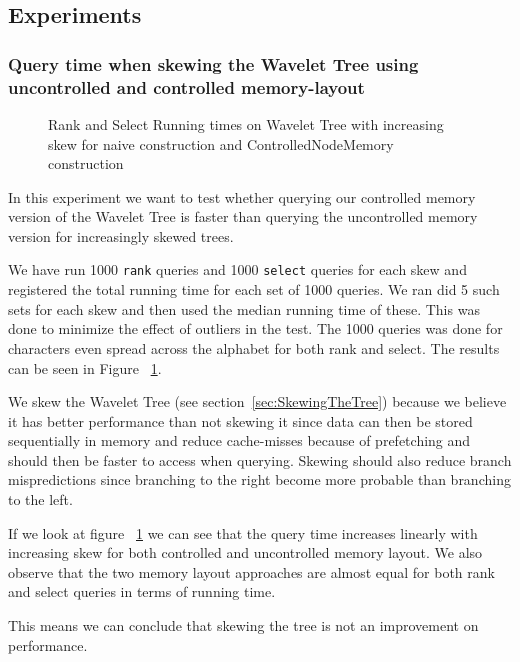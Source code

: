 \subsection{Experiments}

\subsubsection{Query time when skewing the Wavelet Tree using uncontrolled and controlled memory-layout}

\begin{figure}
\caption{Rank and Select Running times on Wavelet Tree with increasing skew for naive construction and ControlledNodeMemory construction}
\label{fig:NaiveRankSelectSkewRunningTime}

\end{figure}


In this experiment we want to test whether querying our controlled memory version of the Wavelet Tree is faster than querying the uncontrolled memory version for increasingly skewed trees. 

We have run 1000 \texttt{rank} queries and 1000 \texttt{select} queries for each skew and registered the total running time for each set of 1000 queries. 
We ran did 5 such sets for each skew and then used the median running time of these. 
This was done to minimize the effect of outliers in the test. The 1000 queries was done for characters even spread across the alphabet for both rank and select. The results can be seen in Figure ~\ref{fig:NaiveRankSelectSkewRunningTime}.

We skew the Wavelet Tree (see section~\ref{sec:SkewingTheTree}) because we believe it has better performance than not skewing it since data can then be stored sequentially in memory and reduce cache-misses because of prefetching and should then be faster to access when querying. 
Skewing should also reduce branch mispredictions since branching to the right become more probable than branching to the left. 

If we look at figure ~\ref{fig:NaiveRankSelectSkewRunningTime} we can see that the query time increases linearly with increasing skew for both controlled and uncontrolled memory layout. We also observe that the two memory layout approaches are almost equal for both rank and select queries in terms of running time.

This means we can conclude that skewing the tree is not an improvement on performance.

